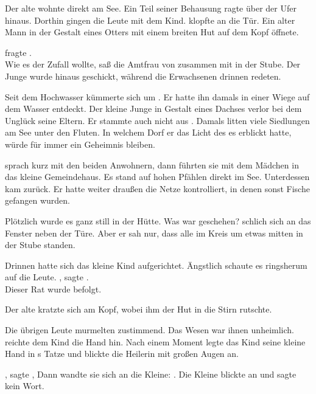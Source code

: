 \begin{Large}
Der alte {\Marn} wohnte direkt am See. Ein Teil seiner Behausung ragte über der Ufer hinaus. Dorthin gingen die Leute mit dem Kind. {\Nox} klopfte an die Tür. Ein alter Mann in der Gestalt eines Otters mit einem breiten Hut auf dem Kopf öffnete.

 fragte {\Nox}. \\
Wie es der Zufall wollte, saß die Amtfrau von {\AltBerna} zusammen mit {\Piedo} in der Stube. Der Junge wurde hinaus geschickt, während die Erwachsenen drinnen redeten.

Seit dem Hochwasser kümmerte sich {\Marn} um {\Piedo}. Er hatte ihn damals in einer Wiege auf dem Wasser entdeckt. Der kleine Junge in Gestalt eines Dachses verlor bei dem Unglück seine Eltern. Er stammte auch nicht aus {\AltBerna}. Damals litten viele Siedlungen am See unter den Fluten. In welchem Dorf er das Licht des {\Enland}es erblickt hatte, würde für immer ein Geheimnis bleiben.

{\Lobo} sprach kurz mit den beiden Anwohnern, dann führten sie {\Nox} mit dem Mädchen in das kleine Gemeindehaus. Es stand auf hohen Pfählen direkt im See. Unterdessen kam {\Piedo} zurück. Er hatte weiter draußen die Netze kontrolliert, in denen sonst Fische gefangen wurden.

Plötzlich wurde es ganz still in der Hütte. Was war geschehen? {\Piedo} schlich sich an das Fenster neben der Türe. Aber er sah nur, dass alle im Kreis um etwas mitten in der Stube standen.

Drinnen hatte sich das kleine Kind aufgerichtet. Ängstlich schaute es ringsherum auf die Leute. , sagte {\Tea}.\\
Dieser Rat wurde befolgt.

Der alte {\Marn} kratzte sich am Kopf, wobei ihm der Hut in die Stirn rutschte. 

Die übrigen Leute murmelten zustimmend. Das Wesen war ihnen unheimlich. {\Salbana} reichte dem Kind die Hand hin. Nach einem Moment legte das Kind seine kleine Hand in {\Salbana}s Tatze und blickte die Heilerin mit großen Augen an.

, sagte {\Salbana},  Dann wandte sie sich an die Kleine: . Die Kleine blickte {\Salbana} an und sagte kein Wort.


\end{Large}
